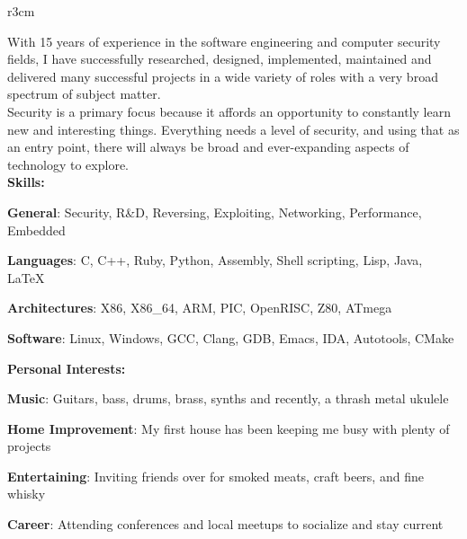 \documentclass[]{SBResume}
\begin{document}
\makeheader


\begin{resume}
  
  \begin{resumetext}
    \begin{wrapfigure}{r}{3cm}
    \insertheadshot
    \end{wrapfigure}
    With 15 years of experience in the software engineering and
    computer security fields, I have successfully researched,
    designed, implemented, maintained and delivered many successful
    projects in a wide variety of roles with a very broad spectrum of
    subject matter.\\
    
    Security is a primary focus because it affords an opportunity to
    constantly learn new and interesting things. Everything needs a
    level of security, and using that as an entry point, there will
    always be broad and ever-expanding aspects of technology to
    explore.\\
    
    \textbf{Skills:}
    \begin{resumeitemize2}
    \item{\textbf{General}: Security, R\&D, Reversing, Exploiting, Networking, Performance, Embedded}
    \item{\textbf{Languages}: C, C++, Ruby, Python, Assembly, Shell scripting, Lisp, Java, \LaTeX}
    \item{\textbf{Architectures}: X86, X86\_64, ARM, PIC, OpenRISC, Z80, ATmega }
    \item{\textbf{Software}: Linux, Windows, GCC, Clang, GDB, Emacs, IDA, Autotools, CMake}
    \end{resumeitemize2}
    
    \textbf{Personal Interests:}
    \begin{resumeitemize2}
    \item{\textbf{Music}: Guitars, bass, drums, brass, synths and recently, a thrash metal ukulele}
    \item{\textbf{Home Improvement}: My first house has been keeping me busy with plenty of projects}
    \item{\textbf{Entertaining}: Inviting friends over for smoked meats, craft beers, and fine whisky}
    \item{\textbf{Career}: Attending conferences and local meetups to socialize and stay current}
    \end{resumeitemize2}



\end{resumetext}
\end{resume}
\end{document}
